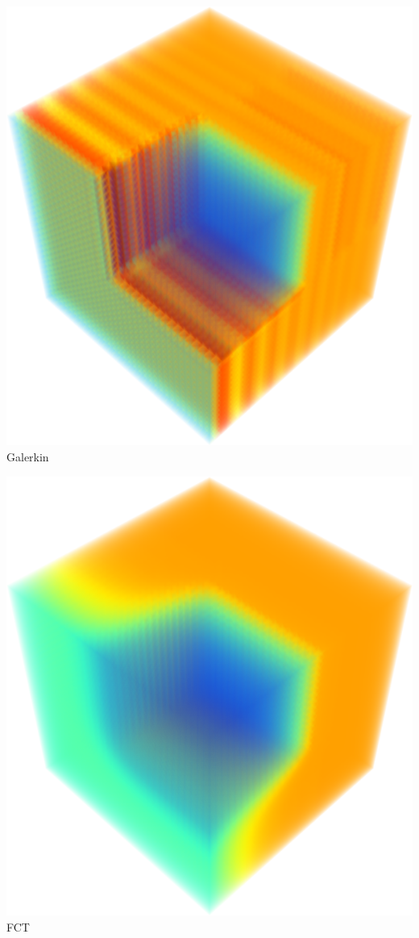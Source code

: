 \begin{minipage}[t]{0.5\linewidth}
  \centering
  \includegraphics[width=\columnwidth]{figures/Gal_3D.png}
  Galerkin
\end{minipage}
\begin{minipage}[t]{0.5\linewidth}
  \centering
  \includegraphics[width=\columnwidth]{figures/GalFCT_3D.png}
  FCT
\end{minipage}
